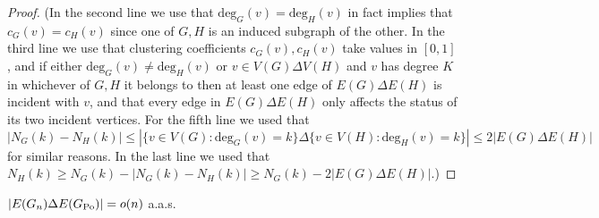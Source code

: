 \begin{proof}
\noindent
(In the second line we use that $\text{deg}_G(v) = \text{deg}_{H}(v)$ in fact 
implies that $c_G(v) = c_{H}(v)$ since one of $G,H$ is an induced subgraph of the other. 
In the third line we use that clustering coefficients $c_G(v), c_H(v)$ take values in $[0,1]$, and if either 
$\text{deg}_{G}(v) \neq \text{deg}_{H}(v)$ or $v \in V(G)\Delta V(H)$ and $v$ has degree $K$ in whichever of $G, H$ it belongs to 
then at least one edge of $E(G)\Delta E(H)$ is incident with $v$, and that every edge in 
$E(G)\Delta E(H)$ only affects the status of its two incident vertices.
For the fifth line we used that $|N_G(k)-N_H(k)| \leq |\{ v\in V(G) : \text{deg}_G(v) = k \} \Delta 
\{ v\in V(H) : \text{deg}_H(v) = k \}| \leq 2|E(G)\Delta E(H)|$ for similar reasons.
In the last line we used that $N_H(k) \geq N_G(k) - |N_G(k)-N_H(k)| \geq N_G(k) - 2|E(G)\Delta E(H)|$.)
\end{proof}

\begin{lemma}\label{lem:NDGnGPo}
$|E(G_n) \Delta E(G_{{\mathrm{Po}}}) | = o(n)$ a.a.s. 
\end{lemma}

